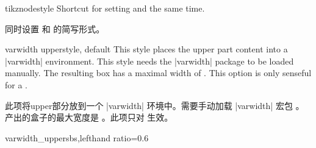 \begin{docTcbKey}{tikznode}{}{style}
Shortcut for setting  and 
the same time.

同时设置  和  的简写形式。
\end{docTcbKey}

\begin{docTcbKey}{varwidth upper}{}{style, default }
This style places the upper part content into a |varwidth| environment.
This style needs the |varwidth| package \cite{arseneau:2011a} to be loaded manually.
The resulting box has a maximal width of .
This option is only senseful for a .


此项将upper部分放到一个 |varwidth| 环境中。需要手动加载 |varwidth| 宏包 %
。产出的盒子的最大宽度是 。此项只对  生效。
\begin{exdispExample*}{varwidth_upper}{sbs,lefthand ratio=0.6}

\end{exdispExample*}
\end{docTcbKey}